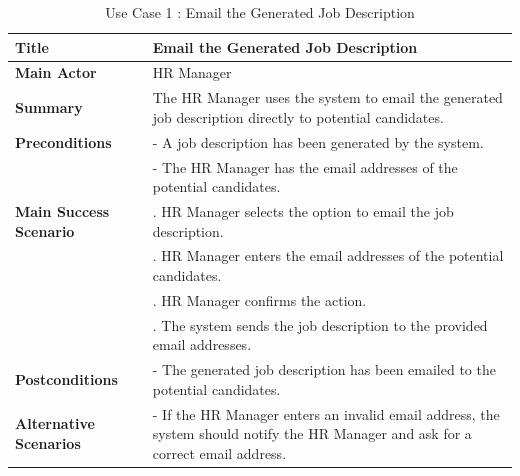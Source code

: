\renewcommand{\arraystretch}{1.5}
\setlength{\tabcolsep}{10pt}

\begin{table}[H]
    \renewcommand{\arraystretch}{1.5}%
    \caption{Use Case 1 : Email the Generated Job Description}
    \centering
    \medskip
    \small
    \begin{tabularx}{1.2\textwidth} {
            | >{\hsize=0.4\hsize\raggedright\arraybackslash}X
            | >{\hsize=1.6\hsize\raggedright\arraybackslash}X |}
        \hline
        \textbf{Title}                 & Email the Generated Job Description                                                                                               \\
        \hline
        \textbf{Main Actor}            & HR Manager                                                                                                                        \\
        \hline
        \textbf{Summary}               & The HR Manager uses the system to email the generated job description directly to potential candidates.                           \\
        \hline
        \textbf{Preconditions}         & - A job description has been generated by the system.                                                                             \\
                                       & - The HR Manager has the email addresses of the potential candidates.                                                             \\
        \hline
        \textbf{Main Success Scenario} & 1. HR Manager selects the option to email the job description.                                                                    \\
                                       & 2. HR Manager enters the email addresses of the potential candidates.                                                             \\
                                       & 3. HR Manager confirms the action.                                                                                                \\
                                       & 4. The system sends the job description to the provided email addresses.                                                          \\
        \hline
        \textbf{Postconditions}        & - The generated job description has been emailed to the potential candidates.                                                     \\
        \hline
        \textbf{Alternative Scenarios} & - If the HR Manager enters an invalid email address, the system should notify the HR Manager and ask for a correct email address. \\
        \hline
    \end{tabularx}
    \normalsize
\end{table}



